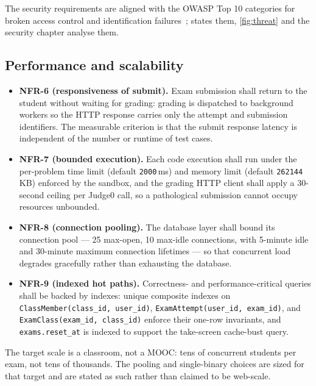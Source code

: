 The security requirements are aligned with the OWASP Top 10 categories for broken access
control and identification failures~\cite{owasp-top10};  states them,
\cref{fig:threat} and the security chapter analyse them.

\subsection{Performance and scalability}
\label{sec:req-nfr-perf}

\begin{itemize}[leftmargin=1.4em]
  \item \textbf{NFR-6 (responsiveness of submit).} Exam submission shall return to the
        student without waiting for grading: grading is dispatched to background workers
        so the HTTP response carries only the attempt and submission identifiers. The
        measurable criterion is that the submit response latency is independent of the
        number or runtime of test cases.
  \item \textbf{NFR-7 (bounded execution).} Each code execution shall run under the
        per-problem time limit (default \texttt{2000}\,ms) and memory limit (default
        \texttt{262144}\,KB) enforced by the sandbox, and the grading HTTP client shall
        apply a 30-second ceiling per Judge0 call, so a pathological submission cannot
        occupy resources unbounded.
  \item \textbf{NFR-8 (connection pooling).} The database layer shall bound its
        connection pool --- 25 max-open, 10 max-idle connections, with 5-minute idle and
        30-minute maximum connection lifetimes --- so that concurrent load degrades
        gracefully rather than exhausting the database.
  \item \textbf{NFR-9 (indexed hot paths).} Correctness- and performance-critical queries
        shall be backed by indexes: unique composite indexes on
        \texttt{ClassMember(class\_id, user\_id)}, \texttt{ExamAttempt(user\_id, exam\_id)},
        and \texttt{ExamClass(exam\_id, class\_id)} enforce their one-row invariants, and
        \texttt{exams.reset\_at} is indexed to support the take-screen cache-bust query.
\end{itemize}

The target scale is a classroom, not a MOOC: tens of concurrent students per exam, not
tens of thousands. The pooling and single-binary choices are sized for that target and
are stated as such rather than claimed to be web-scale.

